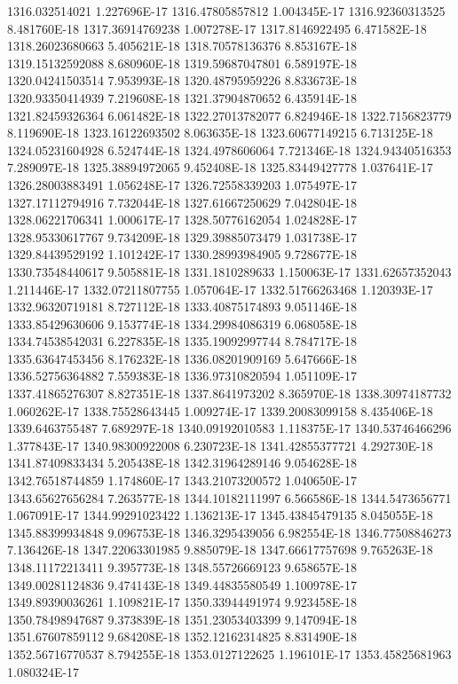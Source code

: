 1316.032514021  1.227696E-17
1316.47805857812  1.004345E-17
1316.92360313525  8.481760E-18
1317.36914769238  1.007278E-17
1317.8146922495  6.471582E-18
1318.26023680663  5.405621E-18
1318.70578136376  8.853167E-18
1319.15132592088  8.680960E-18
1319.59687047801  6.589197E-18
1320.04241503514  7.953993E-18
1320.48795959226  8.833673E-18
1320.93350414939  7.219608E-18
1321.37904870652  6.435914E-18
1321.82459326364  6.061482E-18
1322.27013782077  6.824946E-18
1322.7156823779  8.119690E-18
1323.16122693502  8.063635E-18
1323.60677149215  6.713125E-18
1324.05231604928  6.524744E-18
1324.4978606064  7.721346E-18
1324.94340516353  7.289097E-18
1325.38894972065  9.452408E-18
1325.83449427778  1.037641E-17
1326.28003883491  1.056248E-17
1326.72558339203  1.075497E-17
1327.17112794916  7.732044E-18
1327.61667250629  7.042804E-18
1328.06221706341  1.000617E-17
1328.50776162054  1.024828E-17
1328.95330617767  9.734209E-18
1329.39885073479  1.031738E-17
1329.84439529192  1.101242E-17
1330.28993984905  9.728677E-18
1330.73548440617  9.505881E-18
1331.1810289633  1.150063E-17
1331.62657352043  1.211446E-17
1332.07211807755  1.057064E-17
1332.51766263468  1.120393E-17
1332.96320719181  8.727112E-18
1333.40875174893  9.051146E-18
1333.85429630606  9.153774E-18
1334.29984086319  6.068058E-18
1334.74538542031  6.227835E-18
1335.19092997744  8.784717E-18
1335.63647453456  8.176232E-18
1336.08201909169  5.647666E-18
1336.52756364882  7.559383E-18
1336.97310820594  1.051109E-17
1337.41865276307  8.827351E-18
1337.8641973202  8.365970E-18
1338.30974187732  1.060262E-17
1338.75528643445  1.009274E-17
1339.20083099158  8.435406E-18
1339.6463755487  7.689297E-18
1340.09192010583  1.118375E-17
1340.53746466296  1.377843E-17
1340.98300922008  6.230723E-18
1341.42855377721  4.292730E-18
1341.87409833434  5.205438E-18
1342.31964289146  9.054628E-18
1342.76518744859  1.174860E-17
1343.21073200572  1.040650E-17
1343.65627656284  7.263577E-18
1344.10182111997  6.566586E-18
1344.5473656771  1.067091E-17
1344.99291023422  1.136213E-17
1345.43845479135  8.045055E-18
1345.88399934848  9.096753E-18
1346.3295439056  6.982554E-18
1346.77508846273  7.136426E-18
1347.22063301985  9.885079E-18
1347.66617757698  9.765263E-18
1348.11172213411  9.395773E-18
1348.55726669123  9.658657E-18
1349.00281124836  9.474143E-18
1349.44835580549  1.100978E-17
1349.89390036261  1.109821E-17
1350.33944491974  9.923458E-18
1350.78498947687  9.373839E-18
1351.23053403399  9.147094E-18
1351.67607859112  9.684208E-18
1352.12162314825  8.831490E-18
1352.56716770537  8.794255E-18
1353.0127122625  1.196101E-17
1353.45825681963  1.080324E-17
